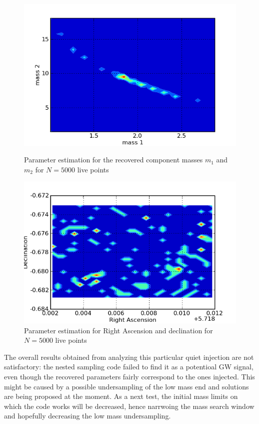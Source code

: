 \documentclass[epsf]{article}
\begin{document}
\begin{figure}[h!]
\begin{minipage}[b]{0.5\linewidth}
\centering
\includegraphics[scale=0.40]{m1m2_5000.png}
\caption{Parameter estimation for the recovered component masses $m_1$ and $m_2$ for $N=5000$ live points}
\label{fig:figure65}
\end{minipage}
\hspace{0.5cm}
\begin{minipage}[b]{0.5\linewidth}
\centering
\includegraphics[scale=0.40]{RAdec_5000.png}
\caption{Parameter estimation for Right Ascension and declination for $N=5000$ live points}
\label{fig:figure67}
\end{minipage}
\end{figure}

The overall results obtained from analyzing this particular quiet injection are not satisfactory: the nested sampling code failed to find it as a potentioal GW signal, even though the recovered parameters fairly correspond to the ones injected. This might be caused by a possible undersampling of the low mass end and solutions are being proposed at the moment. As a next test, the initial mass limits on which the code works will be decreased, hence narrwoing the mass search window and hopefully decreasing the low mass undersampling.
\end{document}
